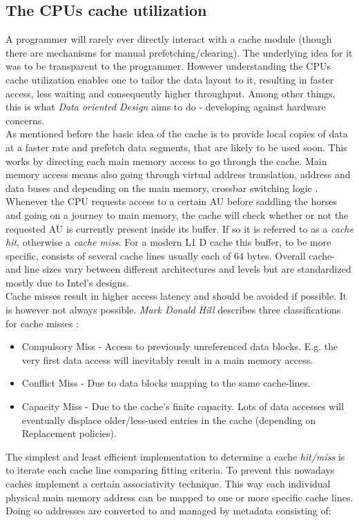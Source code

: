 \subsection{The CPUs cache utilization}\label{cpucu}
A programmer will rarely ever directly interact with a cache module (though there are mechanisms for manual prefetching/clearing). The underlying idea for it was to be transparent to the programmer. However understanding the CPUs cache utilization enables one to tailor the data layout to it, resulting in faster access, less waiting and consequently higher throughput. Among other things, this is what \textit{Data oriented Design} aims to do - developing against hardware concerns. \\
As mentioned before the basic idea of the cache is to provide local copies of data at a faster rate and prefetch data segments, that are likely to be used soon. This works by directing each main memory access to go through the cache. Main memory access means also going through virtual address translation, address and data buses and depending on the main memory, crossbar switching logic .  
Whenever the CPU requests access to a certain AU before saddling the horses and going on a journey to main memory, the cache will check whether or not the requested AU is currently present inside its buffer. If so it is referred to as a \textit{cache hit}, otherwise a \textit{cache miss}. For a modern L1 D cache this buffer, to be more specific, consists of several cache lines usually each of 64 bytes. Overall cache- and line sizes vary between different architectures and levels but are standardized mostly due to Intel's designs.\\
Cache misses result in higher access latency and should be avoided if possible. It is however not always possible. \textit{Mark Donald Hill} describes three classifications for cache misses :
\begin{itemize}
	\item Compulsory Miss - Access to previously unreferenced data blocks. E.g. the very first data access will inevitably result in a main memory access.
	\item Conflict Miss - Due to data blocks mapping to the same cache-lines.
	\item Capacity Miss - Due to the cache's finite capacity. Lots of data accesses will eventually displace older/less-used entries in the cache (depending on Replacement policies).
\end{itemize}
The simplest and least efficient implementation to determine a cache \textit{hit/miss} is to iterate each cache line comparing fitting criteria. To prevent this nowadays caches implement a certain associativity technique. This way each individual physical main memory address can be mapped to one or more specific cache lines. Doing so addresses are converted to and managed by metadata consisting of: 
